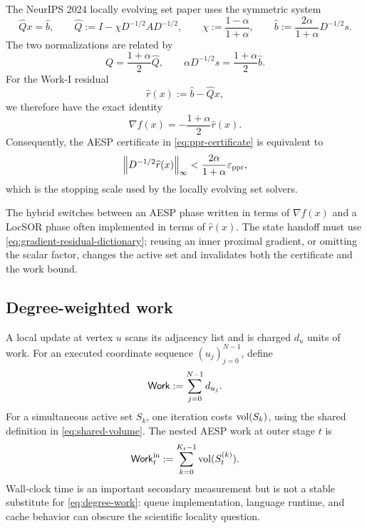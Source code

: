 The NeurIPS 2024 locally evolving set paper uses the symmetric system
\begin{equation}
    \widehat Qx=\widehat b,
    \qquad
    \widehat Q:=I-\chi D^{-1/2}AD^{-1/2},
    \qquad
    \chi:=\frac{1-\alpha}{1+\alpha},
    \qquad
    \widehat b:=\frac{2\alpha}{1+\alpha}D^{-1/2}s.
    \label{eq:work-one-system}
\end{equation}
The two normalizations are related by
\begin{equation}
    Q=\frac{1+\alpha}{2}\widehat Q,
    \qquad
    \alpha D^{-1/2}s
      =\frac{1+\alpha}{2}\widehat b.
    \label{eq:normalization-dictionary}
\end{equation}
For the Work-I residual
\begin{equation}
    \widehat r(x):=\widehat b-\widehat Qx,
    \label{eq:work-one-residual}
\end{equation}
we therefore have the exact identity
\begin{equation}
    \nabla f(x)=-\frac{1+\alpha}{2}\widehat r(x).
    \label{eq:gradient-residual-dictionary}
\end{equation}
Consequently, the AESP certificate in \cref{eq:ppr-certificate} is equivalent
to
\begin{equation}
    \left\lVert D^{-1/2}\widehat r(x)\right\rVert_\infty
    <\frac{2\alpha}{1+\alpha}\varepsilon_{\mathrm{ppr}},
    \label{eq:work-one-certificate}
\end{equation}
which is the stopping scale used by the locally evolving set solvers.

\begin{remark}
The hybrid switches between an AESP phase written in terms of \(\nabla f(x)\) and a
LocSOR phase often implemented in terms of \(\widehat r(x)\).  The state
handoff must use \cref{eq:gradient-residual-dictionary}; reusing an inner
proximal gradient, or omitting the scalar factor, changes the active set and
invalidates both the certificate and the work bound.
\end{remark}

\subsection{Degree-weighted work}

A local update at vertex \(u\) scans its adjacency list and is charged
\(d_u\) units of work.  For an executed coordinate sequence
\((u_j)_{j=0}^{N-1}\), define
\begin{equation}
    \mathsf{Work}:=\sum_{j=0}^{N-1}d_{u_j}.
    \label{eq:degree-work}
\end{equation}
For a simultaneous active set \(S_k\), one iteration costs
\(\operatorname{vol}(S_k)\), using the shared definition in \cref{eq:shared-volume}.
The nested AESP work at outer stage \(t\) is
\begin{equation}
    \mathsf{Work}_t^{\rm in}
    :=\sum_{k=0}^{K_t-1}\operatorname{vol}(S_t^{(k)}).
    \label{eq:aesp-inner-work}
\end{equation}
Wall-clock time is an important secondary measurement but is not a stable
substitute for \cref{eq:degree-work}: queue implementation, language runtime,
and cache behavior can obscure the scientific locality question.

